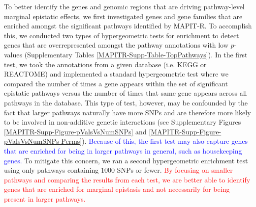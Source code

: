 \documentclass[10pt]{article}
\begin{document}
To better identify the genes and genomic regions that are driving pathway-level marginal epistatic effects, we first investigated genes and gene families that are enriched amongst the significant pathways identified by MAPIT-R. To accomplish this, we conducted two types of hypergeometric tests for enrichment to detect genes that are overrepresented amongst the pathway annotations with low $p$-values (Supplementary Tables \ref{MAPITR-Supp-Table-TopPathways}). In the first test, we took the annotations from a given database (i.e. KEGG or REACTOME) and implemented a standard hypergeometric test where we compared the number of times a gene appears within the set of significant epistatic pathways versus the number of times that same gene appears across all pathways in the database. This type of test, however, may be confounded by the fact that larger pathways naturally have more SNPs and are therefore more likely to be involved in non-additive genetic interactions (see Supplementary Figures \ref{MAPITR-Supp-Figure-pValsVsNumSNPs} and \ref{MAPITR-Supp-Figure-pValsVsNumSNPs-Perms}). \textcolor{blue}{Because of this, the first test may also capture genes that are enriched for being in larger pathways in general, such as housekeeping genes.} To mitigate this concern, we ran a second hypergeometric enrichment test using only pathways containing 1000 SNPs or fewer. \textcolor{red}{By focusing on smaller pathways and comparing the results from each test, we are better able to identify genes that are enriched for marginal epistasis and not necessarily for being present in larger pathways.} 
\end{document}
